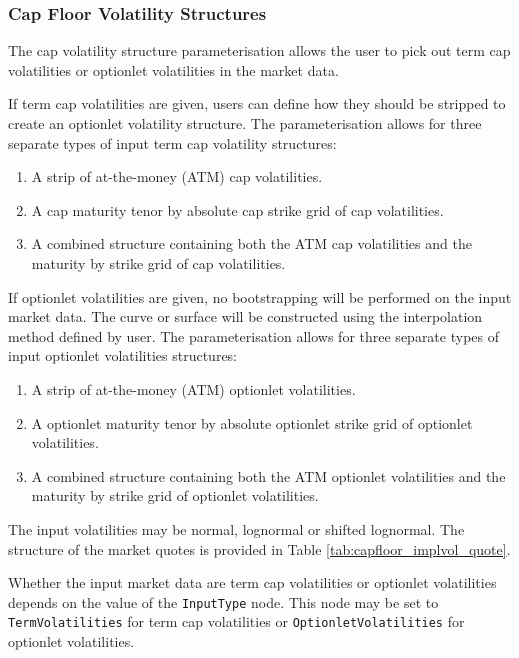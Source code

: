 \subsubsection{Cap Floor Volatility Structures}
\label{sss:capfloorconfig}

The cap volatility structure parameterisation allows the user to pick out term cap volatilities or optionlet volatilities in the market data.

If term cap volatilities are given, users can define how they should be stripped to create an optionlet volatility structure. The parameterisation allows for three separate types of input term cap volatility structures:

\begin{enumerate}
\item A strip of at-the-money (ATM) cap volatilities.
\item A cap maturity tenor by absolute cap strike grid of cap volatilities.
\item A combined structure containing both the ATM cap volatilities and the maturity by strike grid of cap volatilities.
\end{enumerate}

If optionlet volatilities are given, no bootstrapping will be performed on the input market data. The curve or surface will be constructed using the interpolation method defined by user. The parameterisation allows for three separate types of input optionlet volatilities structures:

\begin{enumerate}
\item A strip of at-the-money (ATM) optionlet volatilities.
\item A optionlet maturity tenor by absolute optionlet strike grid of optionlet volatilities.
\item A combined structure containing both the ATM optionlet volatilities and the maturity by strike grid of optionlet volatilities.
\end{enumerate}

The input volatilities may be normal, lognormal or shifted lognormal. The structure of the market quotes is provided in Table \ref{tab:capfloor_implvol_quote}.

Whether the input market data are term cap volatilities or optionlet volatilities depends on the value of the \lstinline!InputType! node. This node may be set to \lstinline!TermVolatilities! for term cap volatilities or \lstinline!OptionletVolatilities! for optionlet volatilities.

